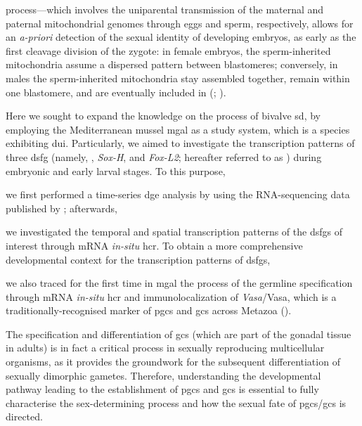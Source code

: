 process---which involves the uniparental transmission of the maternal and paternal mitochondrial genomes through eggs and sperm, respectively, allows for an \textit{a-priori} detection of the sexual identity of developing embryos, as early as the first cleavage division of the zygote: in female embryos, the sperm-inherited mitochondria assume a dispersed pattern between blastomeres; conversely, in males the sperm-inherited mitochondria stay assembled together, remain within one blastomere, and are eventually included in  (; ).

Here we sought to expand the knowledge on the process of bivalve \gls{sd}, by employing the Mediterranean mussel \gls{mgal} as a study system, which is a species exhibiting \gls{dui}. Particularly, we aimed to investigate the transcription patterns of three \gls{dsfg} (namely, , \textit{Sox-H}, and \textit{Fox-L2}; hereafter referred to as ) during embryonic and early larval stages. To this purpose,
\begin{inlinelist}
    \item we first performed a time-series \gls{dge} analysis by using the RNA-sequencing data published by ; afterwards,
    \item we investigated the temporal and spatial transcription patterns of the \glspl{dsfg} of interest through mRNA \textit{in-situ} \gls{hcr}. To obtain a more comprehensive developmental context for the transcription patterns of \glspl{dsfg},
    \item we also traced for the first time in \gls{mgal} the process of the germline specification through mRNA \textit{in-situ} \gls{hcr} and immunolocalization of \textit{Vasa}/Vasa, which is a traditionally-recognised marker of \glspl{pgc} and \glspl{gc} across Metazoa ().
\end{inlinelist}
The specification and differentiation of \glspl{gc} (which are part of the gonadal tissue in adults) is in fact a critical process in sexually reproducing multicellular organisms, as it provides the groundwork for the subsequent differentiation of sexually dimorphic gametes. Therefore, understanding the developmental pathway leading to the establishment of \glspl{pgc} and \glspl{gc} is essential to fully characterise the sex-determining process and how the sexual fate of \glspl{pgc}/\glspl{gc} is directed.

